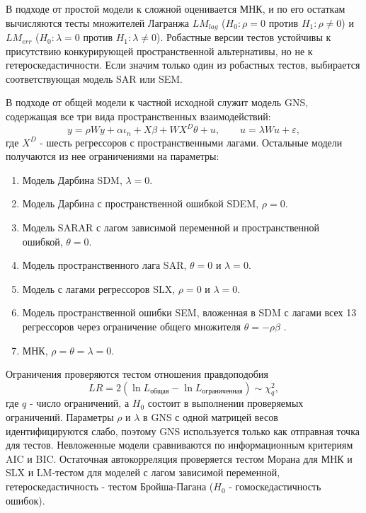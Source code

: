 \documentclass[12pt, a4paper]{article}
\begin{document}
В подходе от простой модели к сложной оценивается МНК, и по его остаткам вычисляются тесты
множителей Лагранжа $LM_{lag}$ ($H_0: \rho = 0$ против $H_1: \rho \ne 0$) и $LM_{err}$
($H_0: \lambda = 0$ против $H_1: \lambda \ne 0$). Робастные версии тестов устойчивы к присутствию
конкурирующей пространственной альтернативы, но не к гетероскедастичности. Если значим только один
из робастных тестов, выбирается соответствующая модель SAR или SEM.

В подходе от общей модели к частной исходной служит модель GNS, содержащая все три вида
пространственных взаимодействий:
\[
y = \rho W y + \alpha \iota_n + X \beta + W X^{D} \theta + u, \qquad u = \lambda W u + \varepsilon,
\]
где $X^{D}$ - шесть регрессоров с пространственными лагами. Остальные модели получаются из нее
ограничениями на параметры:

\begin{enumerate}
    \item Модель Дарбина SDM, $\lambda = 0$.
    \item Модель Дарбина с пространственной ошибкой SDEM, $\rho = 0$.
    \item Модель SARAR с лагом зависимой переменной и пространственной ошибкой, $\theta = 0$.
    \item Модель пространственного лага SAR, $\theta = 0$ и $\lambda = 0$.
    \item Модель с лагами регрессоров SLX, $\rho = 0$ и $\lambda = 0$.
    \item Модель пространственной ошибки SEM, вложенная в SDM с лагами всех 13 регрессоров через
    ограничение общего множителя $\theta = -\rho \beta$ \cite{elhorst2014}.
    \item МНК, $\rho = \theta = \lambda = 0$.
\end{enumerate}

Ограничения проверяются тестом отношения правдоподобия
\[
LR = 2 \left( \ln L_{\text{общая}} - \ln L_{\text{ограниченная}} \right) \sim \chi^2_q,
\]
где $q$ - число ограничений, а $H_0$ состоит в выполнении проверяемых ограничений. Параметры
$\rho$ и $\lambda$ в GNS с одной матрицей весов идентифицируются слабо, поэтому GNS используется
только как отправная точка для тестов. Невложенные модели сравниваются по информационным
критериям AIC и BIC. Остаточная автокорреляция проверяется тестом Морана для МНК и SLX и
LM-тестом для моделей с лагом зависимой переменной, гетероскедастичность - тестом Бройша-Пагана
($H_0$ - гомоскедастичность ошибок).
\end{document}
